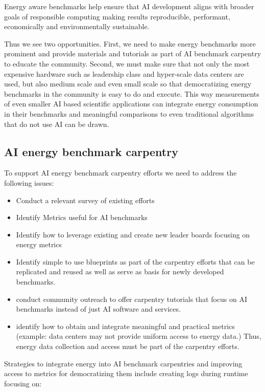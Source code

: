 Energy aware benchmarks help ensure that AI development aligns with broader goals of responsible computing making results reproducible, performant, economically and environmentally sustainable. 

Thus we see two opportunities. First, we need to make energy benchmarks more prominent and provide materials and tutorials as part of AI benchmark carpentry to educate the community. Second, we must make sure that not only the most expensive hardware such as leadership class and hyper-scale data centers are used, but also medium scale and even small scale so that democratizing energy benchmarks in the community is easy to do and execute. This way measurements of even smaller AI based scientific applications can integrate energy consumption in their benchmarks and meaningful comparisons to even traditional algorithms that do not use AI can be drawn.

\subsection{AI energy benchmark carpentry}

To support AI energy benchmark carpentry efforts we need to address the following issues:

\begin{itemize}
\item Conduct a relevant survey of existing efforts
\item Identify Metrics useful for AI benchmarks 
\item Identify how to leverage existing and create new leader boards focusing on energy metrics
\item Identify simple to use blueprints as part of the carpentry efforts that can be replicated and reused as well as serve as basis for newly developed benchmarks.
\item conduct community outreach to offer carpentry tutorials that focus on AI benchmarks instead of just AI software and services.
\item identify how to obtain and integrate meaningful and practical metrics (example: data centers may not provide uniform access to energy data.) Thus, energy data collection and access must be part of the carpentry efforts.
\end{itemize}

Strategies to integrate energy into AI benchmark carpentries and improving access to metrics for democratizing them include creating logs during runtime focusing on:

